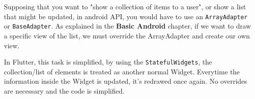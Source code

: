 \begin{tcolorbox}[colback=red!5,colframe=red!75!black, title=Advantages of stateful widgets over android API]
Supposing that you want to "show a collection of items to a user", or show a list that might be updated, 
in android API, you would have to use an \texttt{ArrayAdapter} or \texttt{BaseAdapter}.  
As explained in the \textbf{Basic Android} chapter, if we want to draw a specific view of the list, we must 
override the ArrayAdapter and create our own view.  

In Flutter, this task is simplified, by using the \texttt{StatefulWidgets}, the collection/list of elements 
is treated as another normal Widget. Everytime the information inside the Widget is updated, it's redrawed 
once again. No overrides are necessary and the code is simplified. 
\end{tcolorbox}




